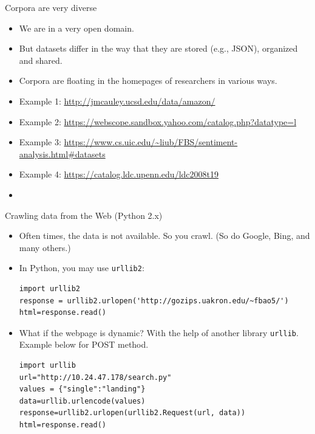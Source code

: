 \documentclass[11pt, handout]{beamer}
\begin{document}
\begin{frame}{Corpora are very diverse}
 \begin{itemize}[<+->]
  \item We are in a very open domain. 
  \item But datasets differ in the way that they are stored (e.g., JSON), organized and shared. 
  \item Corpora are floating in the homepages of researchers in various ways. 
  \item Example 1: \url{http://jmcauley.ucsd.edu/data/amazon/}
  \item Example 2: \url{https://webscope.sandbox.yahoo.com/catalog.php?datatype=l}
  \item Example 3: \url{https://www.cs.uic.edu/~liub/FBS/sentiment-analysis.html\#datasets}
  \item Example 4: \url{https://catalog.ldc.upenn.edu/ldc2008t19}
  \item \color{red}{ Lots of subjectivity in annotated data. }
 \end{itemize}
\end{frame}


\begin{frame}[fragile]{Crawling data from the Web (Python 2.x)}
\begin{itemize}
 \item Often times, the data is not available. So you crawl. (So do Google, Bing, and many others.) 
 \item In Python, you may use \texttt{urllib2}: 
 
 {\small
 \begin{lstlisting}
import urllib2
response = urllib2.urlopen('http://gozips.uakron.edu/~fbao5/')
html=response.read()
 \end{lstlisting}
}
\item What if the webpage is dynamic? With the help of another library \texttt{urllib}. Example below for POST method. 
\begin{lstlisting}
import urllib
url="http://10.24.47.178/search.py"
values = {"single":"landing"}
data=urllib.urlencode(values)
response=urllib2.urlopen(urllib2.Request(url, data))
html=response.read()
\end{lstlisting}
\end{itemize}
\end{frame}
\end{document}
